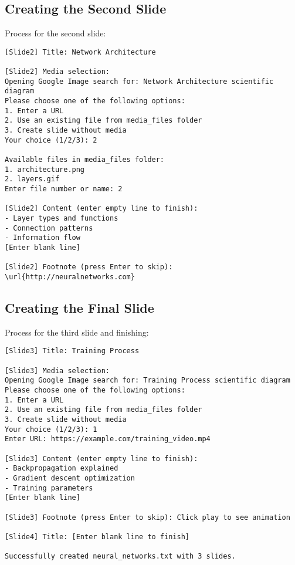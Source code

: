 \documentclass{article}
\begin{document}
\subsection{Creating the Second Slide}
Process for the second slide:

\begin{tcolorbox}[title=Second Slide Creation]
\begin{verbatim}
[Slide2] Title: Network Architecture

[Slide2] Media selection:
Opening Google Image search for: Network Architecture scientific diagram
Please choose one of the following options:
1. Enter a URL
2. Use an existing file from media_files folder
3. Create slide without media
Your choice (1/2/3): 2

Available files in media_files folder:
1. architecture.png
2. layers.gif
Enter file number or name: 2

[Slide2] Content (enter empty line to finish):
- Layer types and functions
- Connection patterns
- Information flow
[Enter blank line]

[Slide2] Footnote (press Enter to skip): \url{http://neuralnetworks.com}
\end{verbatim}
\end{tcolorbox}

\subsection{Creating the Final Slide}
Process for the third slide and finishing:

\begin{tcolorbox}[title=Third Slide and Completion]
\begin{verbatim}
[Slide3] Title: Training Process

[Slide3] Media selection:
Opening Google Image search for: Training Process scientific diagram
Please choose one of the following options:
1. Enter a URL
2. Use an existing file from media_files folder
3. Create slide without media
Your choice (1/2/3): 1
Enter URL: https://example.com/training_video.mp4

[Slide3] Content (enter empty line to finish):
- Backpropagation explained
- Gradient descent optimization
- Training parameters
[Enter blank line]

[Slide3] Footnote (press Enter to skip): Click play to see animation

[Slide4] Title: [Enter blank line to finish]

Successfully created neural_networks.txt with 3 slides.
\end{verbatim}
\end{tcolorbox}
\end{document}
